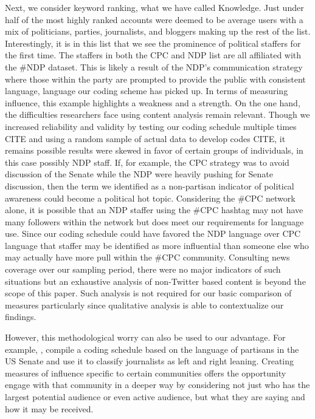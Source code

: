 \documentclass[a4paper,12pt]{article}
\begin{document}
Next, we consider keyword ranking, what we have called Knowledge. Just under half of the most highly ranked accounts were deemed to be average users with a mix of politicians, parties, journalists, and bloggers making up the rest of the list. Interestingly, it is in this list that we see the prominence of political staffers for the first time. The staffers in both the CPC and NDP list are all affiliated with the \#NDP dataset. This is likely a result of the NDP's communication strategy where those within the party are prompted to provide the public with consistent language, language our coding scheme has picked up. In terms of measuring influence, this example highlights a weakness and a strength. On the one hand, the difficulties researchers face using content analysis remain relevant. Though we increased reliability and validity by testing our coding schedule multiple times CITE and using a random sample of actual data to develop codes CITE, it remains possible results were skewed in favor of certain groups of individuals, in this case possibly NDP staff. If, for example, the CPC strategy was to avoid discussion of the Senate while the NDP were heavily pushing for Senate discussion, then the term we identified as a non-partisan indicator of political awareness could become a political hot topic. Considering the \#CPC network alone, it is possible that an NDP staffer using the \#CPC hashtag may not have many followers within the network but does meet our requirements for language use. Since our coding schedule could have favored the NDP language over CPC language that staffer may be identified as more influential than someone else who may actually have more pull within the \#CPC community. Consulting news coverage over our sampling period, there were no major indicators of such situations but an exhaustive analysis of non-Twitter based content is beyond the scope of this paper. Such analysis is not required for our basic comparison of measures particularly since qualitative analysis is able to contextualize our findings.

However, this methodological worry can also be used to our advantage. For example, \cite{Gentzkow2010}, compile a coding schedule based on the language of partisans in the US Senate and use it to classify journalists as left and right leaning. Creating measures of influence specific to certain communities offers the opportunity engage with that community in a deeper way by considering not just who has the largest potential audience or even active audience, but what they are saying and how it may be received.
\end{document}
